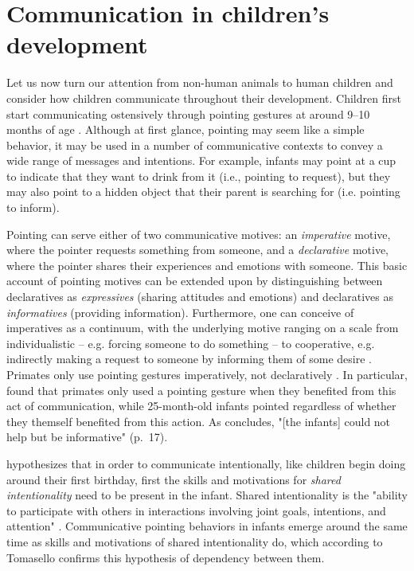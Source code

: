 \section{Communication in children's development}
\label{sec:comm:ontogeny}

Let us now turn our attention from non-human animals to human children and consider how children communicate throughout their development.
Children first start communicating ostensively through pointing gestures at around 9--10 months of age \citep[pp.~20--21 and references therein]{Carpenter98}.
Although at first glance, pointing may seem like a simple behavior, it may be used in a number of communicative contexts to convey a wide range of messages and intentions.
For example, infants may point at a cup to indicate that they want to drink from it (i.e., pointing to request), but they may also point to a hidden object that their parent is searching for (i.e. pointing to inform).

Pointing can serve either of two communicative motives: an \emph{imperative} motive, where the pointer requests something from someone, and a \emph{declarative} motive, where the pointer shares their experiences and emotions with someone.
This basic account of pointing motives can be extended upon by distinguishing between declaratives as \emph{expressives} (sharing attitudes and emotions) and declaratives as \emph{informatives} (providing information). Furthermore, one can conceive of imperatives as a continuum, with the underlying motive ranging on a scale from individualistic -- e.g. forcing someone to do something -- to cooperative, e.g. indirectly making a request to someone by informing them of some desire \citep{Tomasello08}.
Primates only use pointing gestures imperatively, not declaratively \citep{Gomez04, Tomasello05}.
In particular, \citet{Bullinger11} found that primates only used a pointing gesture when they benefited from this act of communication, while 25-month-old infants pointed regardless of whether they themself benefited from this action. As \citet{Tomasello09} concludes, "[the infants] could not help but be informative" (p.~17).

\citet{Tomasello08} hypothesizes that in order to communicate intentionally,
like children begin doing around their first birthday, first the skills and motivations for \emph{shared intentionality} need to be present in the infant.
Shared intentionality is the "ability to participate with others in interactions involving joint goals, intentions, and attention" \citep[p.~139]{Tomasello08}. Communicative pointing behaviors in infants emerge around the same time as skills and motivations of shared intentionality do, which according to Tomasello confirms this hypothesis of dependency between them.

